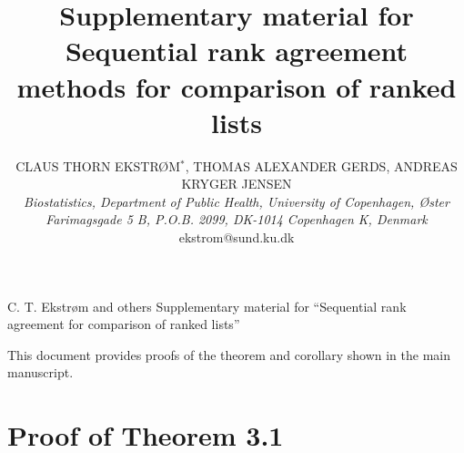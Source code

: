 \documentclass[oupdraft]{bio}
\begin{document}
\title{Supplementary material for Sequential rank agreement methods for comparison of ranked lists}

\author{CLAUS THORN EKSTRØM$^\ast$, THOMAS ALEXANDER GERDS, ANDREAS KRYGER JENSEN\\[4pt]
%
\textit{%
Biostatistics, Department of Public Health,
University of Copenhagen,
Øster Farimagsgade 5 B, P.O.B. 2099,
DK-1014 Copenhagen K, Denmark}
\\[2pt]
{ekstrom@sund.ku.dk}}





\markboth%
{C. T. Ekstrøm and others}
{Supplementary material for ``Sequential rank agreement for comparison of ranked lists''}

\maketitle


This document provides proofs of the theorem and corollary shown in the main manuscript.

\appendix

\section{Proof of Theorem 3.1}
\label{sec:appA}
\end{document}
